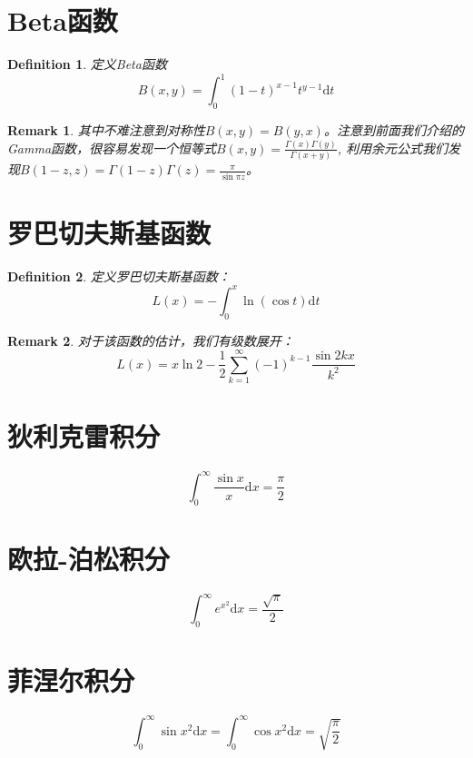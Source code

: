 \documentclass[12pt,a4paper,UTF8]{ctexbook}
\theoremstyle{plain}
\newtheorem{definition}{\indent Definition}[section]
\newtheorem{remark}{\indent Remark}[section]
\begin{document}
\section{Beta函数}
\begin{definition}
定义Beta函数
\begin{equation}
    B(x,y)=\int_0^1(1-t)^{x-1}t^{y-1}\mathrm{d}t 
\end{equation}
\end{definition}
\begin{remark}
其中不难注意到对称性$B(x,y)=B(y,x)$。注意到前面我们介绍的Gamma函数，很容易发现一个恒等式$B(x,y)=\frac{\Gamma(x)\Gamma(y)}{\Gamma(x+y)}$,
利用余元公式我们发现$B(1-z,z)=\Gamma(1-z)\Gamma(z)=\frac{\pi}{\sin \pi z}$。
\end{remark}
\section{罗巴切夫斯基函数}
\begin{definition}
定义罗巴切夫斯基函数：
\begin{equation}
    L(x)=-\int_0^x\ln(\cos t)\mathrm d t
\end{equation}
\end{definition}
\begin{remark}
对于该函数的估计，我们有级数展开：
\begin{equation}
    L(x)=x\ln2 -\frac{1}{2}\sum_{k=1}^\infty(-1)^{k-1}\frac{\sin 2kx}{k^2}
\end{equation}
\end{remark}
\section{狄利克雷积分}
\begin{equation}
    \int_0^\infty \frac{\sin x}{x}\mathrm d x=\frac{\pi}{2}
\end{equation}
\section{欧拉-泊松积分}
\begin{equation}
    \int_0^\infty e^{x^2}\mathrm d x=\frac{\sqrt{\pi}}{2}
\end{equation}
\section{菲涅尔积分}
\begin{equation}
    \int_0^\infty \sin x^2\mathrm d x=\int_0^\infty \cos x^2\mathrm d x=\sqrt{\frac{\pi}{2}}
\end{equation}
\end{document}
